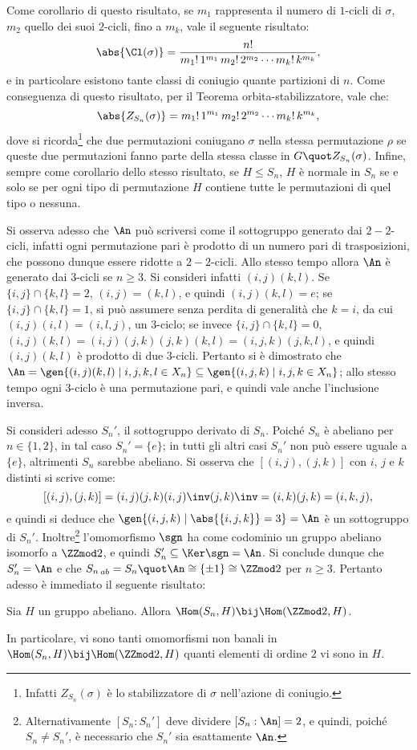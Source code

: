 \documentclass[12pt]{scrartcl}
\begin{document}
	Come corollario di questo risultato, se $m_1$ rappresenta il numero di $1$-cicli di $\sigma$, $m_2$ quello dei suoi $2$-cicli, fino a $m_k$, vale il seguente risultato:
	\[ \abs{\Cl(\sigma)} = \frac{n!}{m_1! \, 1^{m_1} \, m_2! \, 2^{m_2} \cdots m_k! \, k^{m_k}}, \]
	e in particolare esistono tante classi di coniugio quante partizioni di $n$.
	Come conseguenza di questo risultato, per il Teorema orbita-stabilizzatore,
	vale che:
	\[ \abs{Z_{S_n}(\sigma)} = m_1! \, 1^{m_1} \, m_2! \, 2^{m_2} \cdots m_k! \, k^{m_k}, \]
	dove si ricorda\footnote{
		Infatti $Z_{S_n}(\sigma)$ è lo stabilizzatore di $\sigma$ nell'azione di coniugio.
	} che due permutazioni coniugano $\sigma$ nella stessa permutazione
	$\rho$ se queste due permutazioni fanno parte della stessa classe in $G \quot Z_{S_n}(\sigma)$. Infine,
	sempre come corollario dello stesso risultato,
	se $H \leq S_n$, $H$ è normale in $S_n$ se e solo se per ogni tipo di
	permutazione $H$ contiene
	tutte le permutazioni di quel tipo o nessuna. \medskip
	
	
	Si osserva adesso che $\An$ può scriversi come il sottogruppo generato dai
	$2-2$-cicli, infatti ogni permutazione pari è prodotto di un numero pari di trasposizioni,
	che possono dunque essere ridotte a $2-2$-cicli. Allo stesso tempo allora
	$\An$ è generato dai $3$-cicli se $n \geq 3$. Si consideri infatti $(i, j)(k, l)$. Se
	$\{i, j\} \cap \{k, l\} = 2$, $(i, j) = (k, l)$, e quindi $(i, j)(k, l) = e$;
	se $\{i, j\} \cap \{k, l\} = 1$, si può assumere senza perdita di generalità che
	$k = i$, da cui $(i, j)(i, l) = (i, l, j)$, un $3$-ciclo; se invece $\{i, j\} \cap \{k, l\} = 0$,
	$(i, j)(k, l) = (i, j)(j, k)(j, k)(k, l) = (i, j, k)(j, k, l)$, e quindi
	$(i, j)(k, l)$ è prodotto di due $3$-cicli. Pertanto si è dimostrato
	che $\An = \gen{(i, j)(k, l) \mid i, j, k, l \in X_n} \subseteq \gen{(i, j, k) \mid i, j, k \in X_n}$; allo stesso tempo ogni $3$-ciclo è una permutazione
	pari, e quindi vale anche l'inclusione inversa. \medskip
	
	
	
	Si consideri adesso $S_n'$, il sottogruppo derivato di $S_n$. Poiché $S_n$ è abeliano
	per $n \in \{ 1, 2 \}$, in tal caso $S_n' = \{e\}$; in tutti gli altri casi
	$S_n'$ non può essere uguale a $\{e\}$, altrimenti $S_n$ sarebbe abeliano. Si osserva
	che $[(i,j), (j,k)]$ con $i$, $j$ e $k$ distinti si scrive come:
	\[ [(i,j), (j,k)] = (i, j) (j, k) (i, j)\inv (j, k)\inv = (i, k) (j, k) = (i, k, j), \]
	e quindi si deduce che $\gen{(i, j, k) \mid \abs{\{i, j, k\}} = 3} = \An$ è un sottogruppo
	di $S_n'$. Inoltre\footnote{
		Alternativamente $[S_n : S_n']$ deve dividere $[S_n : \An] = 2$, e quindi,
		poiché $S_n \neq S_n'$, è necessario che $S_n'$ sia esattamente $\An$.
	} l'omomorfismo $\sgn$ ha come codominio un gruppo abeliano isomorfo
	a $\ZZmod2$, e quindi $S_n' \subseteq \Ker \sgn = \An$. Si conclude dunque che
	$S_n' = \An$ e che ${S_n}_{\,ab} = S_n \quot \An \cong \{\pm 1\} \cong \ZZmod2$ per $n \geq 3$. Pertanto adesso è immediato il seguente risultato:
	
	\begin{proposition}
		Sia $H$ un gruppo abeliano. Allora $\Hom(S_n, H) \bij \Hom(\ZZmod2, H)$.
	\end{proposition}

	In particolare, vi sono tanti omomorfismi non banali in $\Hom(S_n, H) \bij \Hom(\ZZmod2, H)$ quanti elementi di ordine $2$ vi sono in $H$.
\end{document}
